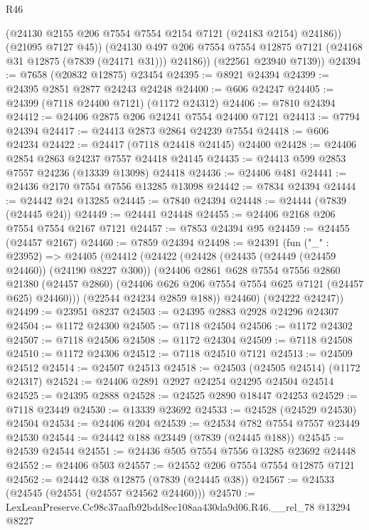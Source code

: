 \begin{lexlean}{R46}
\begin{coremodule}
            (@24130 @2155 @206 @7554 @7554 @2154 @7121 (@24183 @2154) @24186))
          (@21095 @7127 @45))
        (@24130 @497 @206 @7554 @7554 @12875 @7121 (@24168 @31 @12875 (@7839 (@24171 @31))) @24186))
      (@22561 @23940 @7139))
@24394 := @7658 (@20832 @12875) @23454
@24395 := @8921 @24394
@24399 := @24395 @2851 @2877 @24243 @24248
@24400 := @606 @24247
@24405 := @24399 (@7118 @24400 @7121) (@1172 @24312)
@24406 := @7810 @24394
@24412 := @24406 @2875 @206 @24241 @7554 @24400 @7121
@24413 := @7794 @24394
@24417 := @24413 @2873 @2864 @24239 @7554
@24418 := @606 @24234
@24422 := @24417 (@7118 @24418 @24145) @24400
@24428 := @24406 @2854 @2863 @24237 @7557 @24418 @24145
@24435 := @24413 @599 @2853 @7557 @24236 (@13339 @13098) @24418
@24436 := @24406 @481
@24441 := @24436 @2170 @7554 @7556 @13285 @13098
@24442 := @7834 @24394
@24444 := @24442 @24 @13285
@24445 := @7840 @24394
@24448 := @24444 (@7839 (@24445 @24))
@24449 := @24441 @24448
@24455 := @24406 @2168 @206 @7554 @7554 @2167 @7121
@24457 := @7853 @24394 @95
@24459 := @24455 (@24457 @2167)
@24460 := @7859 @24394
@24498 := @24391
    (fun ("_" : @23952) =>
    @24405
      (@24412
        (@24422
          (@24428
            (@24435 (@24449 (@24459 @24460)) (@24190 @8227 @300))
            (@24406
              @2861
              @628
              @7554
              @7556
              @2860
              @21380
              (@24457 @2860)
              (@24406 @626 @206 @7554 @7554 @625 @7121 (@24457 @625) @24460)))
          (@22544 @24234 @2859 @188))
        @24460)
      (@24222 @24247))
@24499 := @23951 @8237
@24503 := @24395 @2883 @2928 @24296 @24307
@24504 := @1172 @24300
@24505 := @7118 @24504
@24506 := @1172 @24302
@24507 := @7118 @24506
@24508 := @1172 @24304
@24509 := @7118 @24508
@24510 := @1172 @24306
@24512 := @7118 @24510 @7121
@24513 := @24509 @24512
@24514 := @24507 @24513
@24518 := @24503 (@24505 @24514) (@1172 @24317)
@24524 := @24406 @2891 @2927 @24254 @24295 @24504 @24514
@24525 := @24395 @2888
@24528 := @24525 @2890 @18447 @24253
@24529 := @7118 @23449
@24530 := @13339 @23692
@24533 := @24528 (@24529 @24530) @24504
@24534 := @24406 @204
@24539 := @24534 @782 @7554 @7557 @23449 @24530
@24544 := @24442 @188 @23449 (@7839 (@24445 @188))
@24545 := @24539 @24544
@24551 := @24436 @505 @7554 @7556 @13285 @23692 @24448
@24552 := @24406 @503
@24557 := @24552 @206 @7554 @7554 @12875 @7121
@24562 := @24442 @38 @12875 (@7839 (@24445 @38))
@24567 := @24533 (@24545 (@24551 (@24557 @24562 @24460)))
@24570 := LexLeanPreserve.Cc98c37aafb92bdd8ec108aa430da9d06.R46.__rel_78 @13294 @8227

\end{coremodule}
\end{lexlean}
